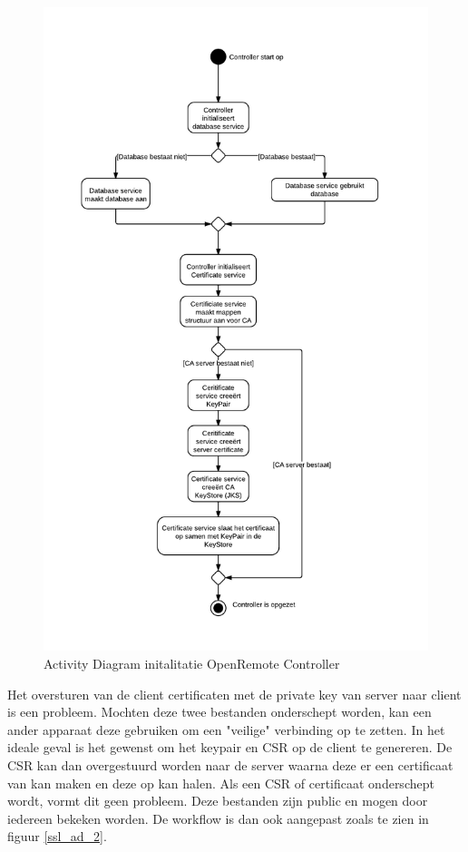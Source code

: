 \documentclass[]{article}
\begin{document}
\begin{figure}[htpb]
   \begin{center}
     \includegraphics[height=0.84\textheight]{OpenremoteControllerAd.pdf}
   \end{center}
   \caption{Activity Diagram initalitatie OpenRemote Controller}
   \label{init_controller}
\end{figure}


Het oversturen van de client certificaten met de private key van server naar
client is een probleem. Mochten deze twee bestanden onderschept worden, kan een
ander apparaat deze gebruiken om een "veilige" verbinding op te zetten. In het
ideale geval is het gewenst om het keypair en CSR op de client te genereren. De
CSR kan dan overgestuurd worden naar de server waarna deze er een certificaat
van kan maken en deze op kan halen. Als een CSR of certificaat onderschept
wordt, vormt dit geen probleem. Deze bestanden zijn public en mogen door
iedereen bekeken worden. De workflow is dan ook aangepast zoals te zien in
figuur \ref{ssl_ad_2}.
\end{document}
